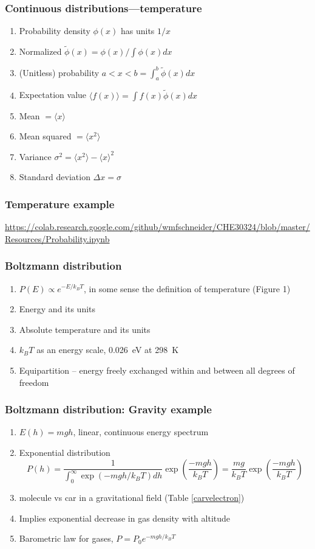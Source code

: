 \documentclass[11pt]{article}
\begin{document}
\subsubsection{Continuous distributions---temperature}
\label{sec:org3bf56ed}
\begin{enumerate}
\item Probability density \(\phi(x)\) has units \(1/x\)
\item Normalized \(\tilde \phi(x) = \phi(x)/\int \phi(x) dx\)
\item (Unitless) probability \(a < x < b = \int_a^b \tilde \phi(x) dx\)
\item Expectation value \(\langle f(x) \rangle = \int f(x) \tilde \phi(x) dx\)
\item Mean \(= \langle x \rangle\)
\item Mean squared \(= \langle x^2 \rangle\)
\item Variance \(\sigma^2=\langle x^2 \rangle - \langle x \rangle^2\)
\item Standard deviation \(\Delta x = \sigma\)
\end{enumerate}

\subsubsection{Temperature example}
\label{sec:org8fa2401}
\url{https://colab.research.google.com/github/wmfschneider/CHE30324/blob/master/Resources/Probability.ipynb}

\subsubsection{Boltzmann distribution}
\label{sec:orgeda42ad}
\begin{enumerate}
\item \(P(E) \propto e^{-E/k_BT}\), in some sense the definition of temperature (Figure 1)
\item Energy and its units
\item Absolute temperature and its units
\item \(k_BT\) as an energy scale, \SI{0.026}{eV} at \SI{298}{K}
\item Equipartition -- energy freely exchanged within and between all degrees of freedom
\end{enumerate}
\subsubsection{Boltzmann distribution: Gravity example}
\label{sec:orgf868c90}
\begin{enumerate}
\item \(E(h)=mgh\), linear, continuous energy spectrum
\item Exponential distribution
\[P(h) = \frac{1}{\int_0^\infty \exp\left(-mgh/k_BT\right)dh }\exp\left(\frac{-mgh}{k_BT}\right )  =  \frac{mg}{k_BT}\exp\left(\frac{-mgh}{k_BT}\right)\]
\item molecule vs car in a gravitational field (Table \ref{carvelectron})
\item Implies exponential decrease in gas density with altitude
\item Barometric law for gases, \(P=P_0e^{-mgh/k_BT}\)
\end{enumerate}
\end{document}
